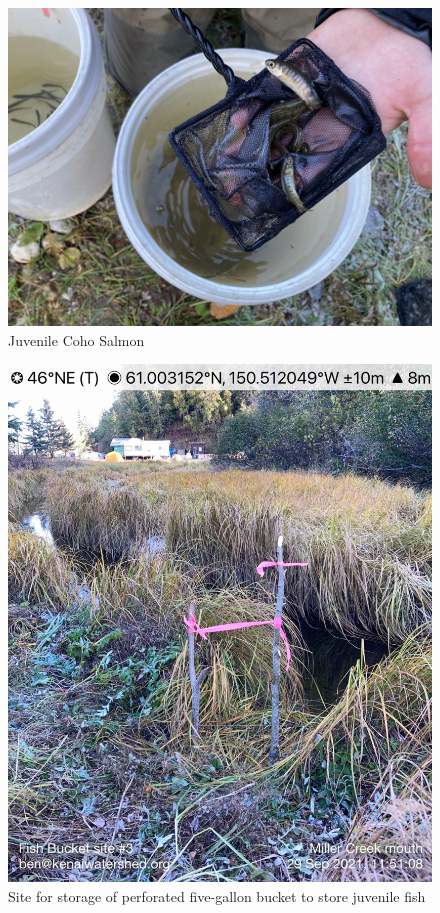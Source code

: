 \documentclass[
]{book}
\begin{document}
\begin{figure}
\centering
\includegraphics{images/fish_rescue/IMG-6272.jpg}
\caption{\label{fig:unnamed-chunk-21}Juvenile Coho Salmon}
\end{figure}

\begin{figure}
\centering
\includegraphics{images/fish_rescue/IMG-6274.jpg}
\caption{\label{fig:unnamed-chunk-22}Site for storage of perforated five-gallon bucket to store juvenile fish}
\end{figure}
\end{document}
